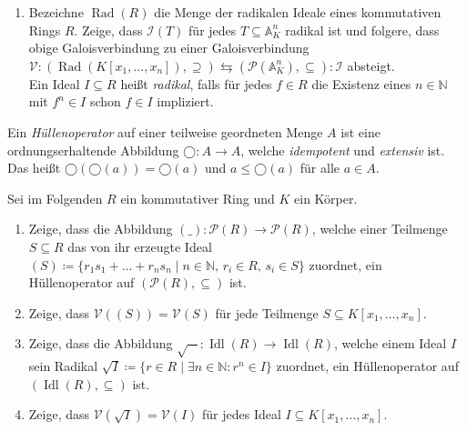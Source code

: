 \documentclass{uebungsblatt}
\DeclareMathOperator{\Idl}{Idl}
\DeclareMathOperator{\Rad}{Rad}
\begin{document}
\begin{exercise}[Galoisverbindungen]
\begin{enumerate}
    \item Bezeichne $\Rad(R)$ die Menge der radikalen Ideale eines kommutativen Rings $R$.
    Zeige, dass $ℐ(T)$ für jedes $T⊆𝔸^n_K$ radikal ist und folgere, dass obige Galoisverbindung zu einer Galoisverbindung $𝒱:(\Rad(K[x_1,\dots,x_n]),⊇) ⇆ (𝒫(𝔸^n_K),⊆):ℐ$ absteigt.\\
      {\scriptsize Ein Ideal $I⊆R$ heißt \emph{radikal}, falls für jedes $f ∈ R$ die Existenz eines $n ∈ ℕ$ mit $f^n ∈ I$ schon $f ∈ I$ impliziert.}
  \end{enumerate}
\end{exercise}

\begin{exercise}[Hüllenoperatoren]
  Ein \emph{Hüllenoperator} auf einer teilweise geordneten Menge $A$ ist eine ordnungserhaltende Abbildung $◯:A → A$, welche \emph{idempotent} und \emph{extensiv} ist.
  Das heißt $◯(◯(a))=◯(a)$ und $a ≤ ◯(a)$ für alle $a ∈ A$.

  Sei im Folgenden $R$ ein kommutativer Ring und $K$ ein Körper.
  \begin{enumerate}
    \item Zeige, dass die Abbildung $(\_):𝒫(R) → 𝒫(R)$, welche einer Teilmenge $S⊆R$ das von ihr erzeugte Ideal $(S)\coloneqq \{r_1s_1 + \dots + r_ns_n \mid n ∈ ℕ,\, r_i ∈ R,\, s_i ∈ S\}$ zuordnet, ein Hüllenoperator auf $(𝒫(R),⊆)$ ist.
    \item Zeige, dass $𝒱((S))=𝒱(S)$ für jede Teilmenge $S⊆K[x_1,\dots,x_n]$.
    \item Zeige, dass die Abbildung $\sqrt{-}:\Idl(R) → \Idl(R)$, welche einem Ideal $I$ sein Radikal $\sqrt{I}\coloneqq\{r ∈ R \mid ∃n ∈ ℕ : r^n ∈ I\}$ zuordnet, ein Hüllenoperator auf $(\Idl(R),⊆)$ ist.
    \item Zeige, dass $𝒱(\sqrt{I})=𝒱(I)$ für jedes Ideal $I⊆K[x_1,\dots,x_n]$.
  \end{enumerate}
\end{exercise}
\end{document}
